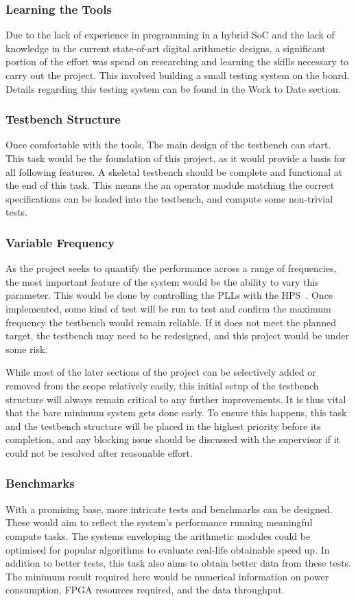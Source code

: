 \subsubsection{\textbf{Learning the Tools}}
Due to the lack of experience in programming in a hybrid SoC and the lack of
knowledge in the current state-of-art digital arithmetic designs, a significant
portion of the effort was spend on researching and learning the skills
necessary to carry out the project.
This involved building a small testing system on the board.
Details regarding this testing system can be found in the Work to Date section.

\subsubsection{\textbf{Testbench Structure}}
Once comfortable with the tools, The main design of the testbench can start.
This task would be the foundation of this project, as it would provide a basis
for all following features.
A skeletal testbench should be complete and functional at the end of this
task.
This means the an operator module matching the correct specifications can
be loaded into the testbench, and compute some non-trivial tests.

\subsubsection{\textbf{Variable Frequency}}
As the project seeks to quantify the performance across a range of frequencies,
the most important feature of the system would be the ability to vary this
parameter.
This would be done by controlling the PLLs with the HPS~\cite{Altera4}.
Once implemented, some kind of test will be run to test and confirm the maximum
frequency the testbench would remain reliable.
If it does not meet the planned target, the testbench may need to be redesigned,
and this project would be under some risk.

While most of the later sections of the project can be selectively added or
removed from the scope relatively easily, this initial setup of the testbench
structure will always remain critical to any further improvements.
It is thus vital that the bare minimum system gets done early.
To ensure this happens, this task and the testbench structure will be placed in
the highest priority before its completion, and any blocking issue should be
discussed with the supervisor if it could not be resolved after reasonable
effort.

\subsubsection{\textbf{Benchmarks}}
With a promising base, more intricate tests and benchmarks can be designed.
These would aim to reflect the system's performance running meaningful compute
tasks.
The systems enveloping the arithmetic modules could be optimised for popular
algorithms to evaluate real-life obtainable speed up.
In addition to better tests, this task also aims to obtain better data from
these tests.
The minimum result required here would be numerical information on power
consumption, FPGA resources required, and the data throughput.

